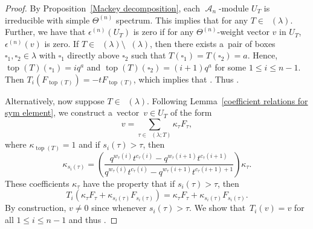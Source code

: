\documentclass[pdftex]{sigma}
\numberwithin{equation}{section}
\theoremstyle{definition}
\DeclareMathOperator{\RYT}{\mathrm{RYT}_{\geq 0}}
\DeclareMathOperator{\PSYT}{\mathrm{PSYT}_{\geq 0}}
\DeclareMathOperator{\RSSYT}{\mathrm{RSSYT}_{\geq 0}}
\DeclareMathOperator{\sA}{\mathscr{A}}
\DeclareMathOperator{\Top}{\mathrm{top}}
\begin{document}
 \begin{proof}
 By Proposition~\ref{Mackey decomposition}, each $\sA_n$-module $U_T$ is irreducible with simple $\Theta^{(n)}$ spectrum. This implies that  for any $T \in \RYT(\lambda)$. Further, we have that $\epsilon^{(n)}(U_T)$ is zero if for any $\Theta^{(n)}$-weight vector $v$ in $U_T$, $\epsilon^{(n)}(v)$ is zero. If $T \in \RYT(\lambda) \setminus \RSSYT(\lambda)$, then there exists a~pair of boxes $\square_1,\square_2 \in \lambda$ with $\square_1$ directly above $\square_2$ such that $T(\square_1) = T(\square_2) = a$. Hence, $\Top(T)(\square_1) = iq^{a}$ and $\Top(T)(\square_2) = (i+1)q^a$ for some $1\leq i \leq n-1$. Then $T_i(F_{\Top(T)}) = -tF_{\Top(T)}$, which implies that \smash{$\epsilon^{(n)}(F_{\Top(T)}) = 0$}. Thus .

 Alternatively, now suppose $T \in \RSSYT(\lambda)$. Following Lemma~\ref{coefficient relations for sym element}, we construct a~vector~${v \in U_{T}}$ of the form
 \[
 v = \sum_{\tau \in \PSYT(\lambda;T)} \kappa_{\tau}F_{\tau},
 \]
 where $\kappa_{\Top(T)} = 1$ and if $s_i(\tau) > \tau$, then
 \[
 \kappa_{s_i(\tau)} = \left( \frac{q^{w_{\tau}(i)}t^{c_{\tau}(i)} - q^{w_{\tau}(i+1)}t^{c_{\tau}(i+1)}}{q^{w_{\tau}(i)}t^{c_{\tau}(i)} - q^{w_{\tau}(i+1)}t^{c_{\tau}(i+1)+1}} \right) \kappa_{\tau}.
 \]
 These coefficients $\kappa_{\tau}$ have the property that if $s_i(\tau) > \tau$, then
 \[
 T_i(\kappa_{\tau}F_{\tau} + \kappa_{s_i(\tau)}F_{s_i(\tau)}) = \kappa_{\tau}F_{\tau} + \kappa_{s_i(\tau)}F_{s_i(\tau)}.
 \]
 By construction, $v \neq 0$ since  whenever $s_i(\tau) > \tau$. We show that~${T_i(v) = v}$ for all $1\leq i \leq n-1$ and thus .


\end{proof}
\end{document}
